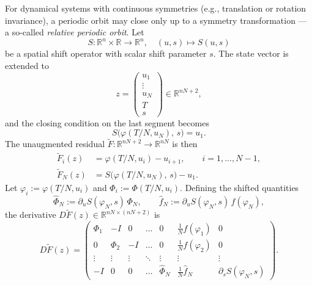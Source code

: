 \documentclass[11pt,a4paper]{article}
\begin{document}
For dynamical systems with continuous symmetries (e.g., translation or rotation invariance), a periodic orbit may close only up to a symmetry transformation — a so-called \textit{relative periodic orbit}. Let
\begin{equation*}
    S: \mathbb{R}^n \times \mathbb{R} \to \mathbb{R}^n, \quad (u, s) \mapsto S(u, s)
\end{equation*}
be a spatial shift operator with scalar shift parameter $s$. The state vector is extended to
\begin{equation*}
    z = \begin{pmatrix} u_1 \\ \vdots \\ u_N \\ T \\ s \end{pmatrix} \in \mathbb{R}^{nN+2},
\end{equation*}
and the closing condition on the last segment becomes
\begin{equation*}
    S\bigl(\varphi(T/N, u_N),\, s\bigr) = u_1.
\end{equation*}
The unaugmented residual $\tilde{F}: \mathbb{R}^{nN+2} \to \mathbb{R}^{nN}$ is then
\begin{align*}
    \tilde{F}_i(z) &= \varphi(T/N, u_i) - u_{i+1}, \qquad i = 1, \dots, N-1, \\[2pt]
    \tilde{F}_N(z) &= S\bigl(\varphi(T/N, u_N),\, s\bigr) - u_1.
\end{align*}
Let $\varphi_i := \varphi(T/N, u_i)$ and $\Phi_i := \Phi(T/N, u_i)$.  Defining the shifted quantities
\begin{equation*}
    \widehat{\Phi}_N := \partial_u S(\varphi_N, s)\,\Phi_N, \qquad
    \widehat{f}_N   := \partial_u S(\varphi_N, s)\,f(\varphi_N),
\end{equation*}
the derivative $D\tilde{F}(z) \in \mathbb{R}^{nN \times (nN+2)}$ is
\begin{equation}\label{eq:jac_spatial_shift}
    D\tilde{F}(z) = 
    \begin{pmatrix}
        \Phi_1      & -I          & 0           & \dots  & 0              & \frac{1}{N}f(\varphi_1)       & 0 \\[4pt]
        0           & \Phi_2      & -I          & \dots  & 0              & \frac{1}{N}f(\varphi_2)       & 0 \\[4pt]
        \vdots      & \vdots      & \vdots      & \ddots & \vdots         & \vdots                        & \vdots \\[4pt]
        -I          & 0           & 0           & \dots  & \widehat{\Phi}_N & \frac{1}{N}\widehat{f}_N   & \partial_s S(\varphi_N, s)
    \end{pmatrix}.
\end{equation}
\end{document}
